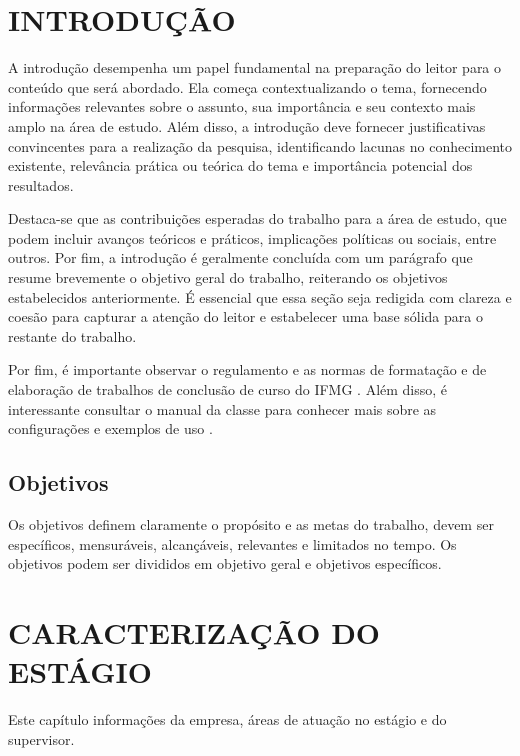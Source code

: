 \documentclass[estagio]{iftex2024}
\begin{document}
\maketitle

\chapter{INTRODUÇÃO}

A introdução desempenha um papel fundamental na preparação do leitor para o conteúdo que será abordado.
Ela começa contextualizando o tema, fornecendo informações relevantes sobre o assunto, sua importância e seu contexto mais amplo na área de estudo.
Além disso, a introdução deve fornecer justificativas convincentes para a realização da pesquisa, identificando lacunas no conhecimento existente, relevância prática ou teórica do tema e importância potencial dos resultados.

Destaca-se que as contribuições esperadas do trabalho para a área de estudo, que podem incluir avanços teóricos e práticos, implicações políticas ou sociais, entre outros.
Por fim, a introdução é geralmente concluída com um parágrafo que resume brevemente o objetivo geral do trabalho, reiterando os objetivos estabelecidos anteriormente.
É essencial que essa seção seja redigida com clareza e coesão para capturar a atenção do leitor e estabelecer uma base sólida para o restante do trabalho.

Por fim, é importante observar o regulamento e as normas de formatação e de elaboração de trabalhos de conclusão de curso do IFMG \cite{ifmg:2020:manual,ifmg:2021:tcc}.
Além disso, é interessante consultar o manual da classe \iftex para conhecer mais sobre as configurações e exemplos de uso \cite{ribeiro:2024:iftex}.

\section{Objetivos}

Os objetivos definem claramente o propósito e as metas do trabalho, devem ser específicos, mensuráveis, alcançáveis, relevantes e limitados no tempo.
Os objetivos podem ser divididos em objetivo geral e objetivos específicos.

\chapter{CARACTERIZAÇÃO DO ESTÁGIO}

Este capítulo informações da empresa, áreas de atuação no estágio e do supervisor.
\end{document}
